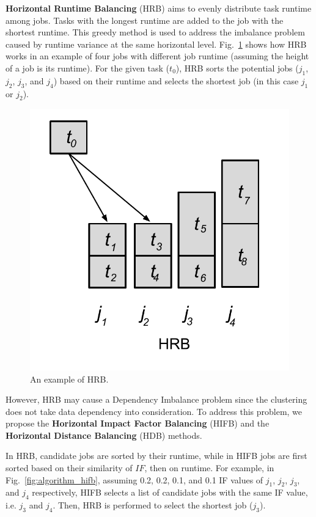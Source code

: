 \documentclass[final]{IEEEtran}
\begin{document}
\textbf{Horizontal Runtime Balancing} (HRB) aims to evenly distribute task runtime among jobs. Tasks with the longest runtime are added to the job with the shortest runtime. This greedy method is used to address the imbalance problem caused by runtime variance at the same horizontal level. Fig.~\ref{fig:algorithm_hrb} shows how HRB works in an example of four jobs with different job runtime (assuming the height of a job is its runtime). For the given task ($t_0$), HRB sorts the potential jobs ($j_1$, $j_2$, $j_3$, and $j_4$) based on their runtime and selects the shortest job (in this case $j_1$ or $j_2$). 

\begin{figure}[htb]
	\centering
	\includegraphics[width=0.5\linewidth]{figure/algorithm_hrb.pdf}
	\caption{An example of HRB.}
	\label{fig:algorithm_hrb}
	\vspace{-15pt}
\end{figure}

However, HRB may cause a Dependency Imbalance problem since the clustering does not take data dependency into consideration. To address this problem, we propose the \textbf{Horizontal Impact Factor Balancing} (HIFB) and the \textbf{Horizontal Distance Balancing} (HDB) methods. 

In HRB, candidate jobs are sorted by their runtime, while in HIFB jobs are first sorted based on their similarity of $IF$, then on runtime. For example, in Fig.~\ref{fig:algorithm_hifb}, assuming 0.2, 0.2, 0.1, and 0.1 IF values of $j_1$, $j_2$, $j_3$, and $j_4$ respectively, HIFB selects a list of candidate jobs with the same IF value, i.e. $j_3$ and $j_4$. Then, HRB is performed to select the shortest job ($j_3$). 
\end{document}
